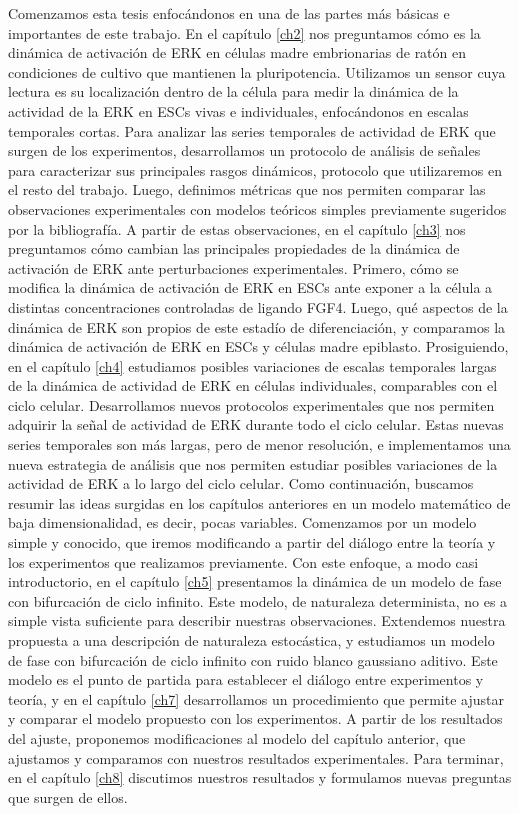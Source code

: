 \documentclass[./main.tex]{subfiles}
\begin{document}
Comenzamos esta tesis enfocándonos en una de las partes más básicas e importantes de este trabajo. En el capítulo \ref{ch2} nos preguntamos cómo es la dinámica de activación de ERK en células madre embrionarias de ratón en condiciones de cultivo que mantienen la pluripotencia. Utilizamos un sensor cuya lectura es su localización dentro de la célula para medir la dinámica de la actividad de la ERK en ESCs vivas e individuales, enfocándonos en escalas temporales cortas. Para analizar las series temporales de actividad de ERK que surgen de los experimentos, desarrollamos un protocolo de análisis de señales para caracterizar sus principales rasgos dinámicos, protocolo que utilizaremos en el resto del trabajo. Luego, definimos métricas que nos permiten comparar las observaciones experimentales con modelos teóricos simples previamente sugeridos por la bibliografía. A partir de estas observaciones, en el capítulo \ref{ch3} nos preguntamos cómo cambian las principales propiedades de la dinámica de activación de ERK ante perturbaciones experimentales. Primero, cómo se modifica la dinámica de activación de ERK en ESCs ante exponer a la célula a distintas concentraciones controladas de ligando FGF4. Luego, qué aspectos de la dinámica de ERK son propios de este estadío de diferenciación, y comparamos la dinámica de activación de ERK en ESCs y células madre epiblasto. Prosiguiendo, en el capítulo \ref{ch4} estudiamos posibles variaciones de escalas temporales largas de la dinámica de actividad de ERK en células individuales, comparables con el ciclo celular. Desarrollamos nuevos protocolos experimentales que nos permiten adquirir la señal de actividad de ERK durante todo el ciclo celular. Estas nuevas series temporales son más largas, pero de menor resolución, e implementamos una nueva estrategia de análisis que nos permiten estudiar posibles variaciones de la actividad de ERK a lo largo del ciclo celular. Como continuación, buscamos resumir las ideas surgidas en los capítulos anteriores en un modelo matemático de baja dimensionalidad, es decir, pocas variables. Comenzamos por un modelo simple y conocido, que iremos modificando a partir del diálogo entre la teoría y los experimentos que realizamos previamente. Con este enfoque, a modo casi introductorio, en el capítulo \ref{ch5} presentamos la dinámica de un modelo de fase con bifurcación de ciclo infinito. Este modelo, de naturaleza determinista, no es a simple vista suficiente para describir nuestras observaciones. Extendemos nuestra propuesta a una descripción de naturaleza estocástica, y estudiamos un modelo de fase con bifurcación de ciclo infinito con ruido blanco gaussiano aditivo. Este modelo es el punto de partida para establecer el diálogo entre experimentos y teoría, y en el capítulo \ref{ch7} desarrollamos un procedimiento que permite ajustar y comparar el modelo propuesto con los experimentos. A partir de los resultados del ajuste, proponemos modificaciones al modelo del capítulo anterior, que ajustamos y comparamos con nuestros resultados experimentales. Para terminar, en el capítulo \ref{ch8} discutimos nuestros resultados y formulamos nuevas preguntas que surgen de ellos.
\end{document}
